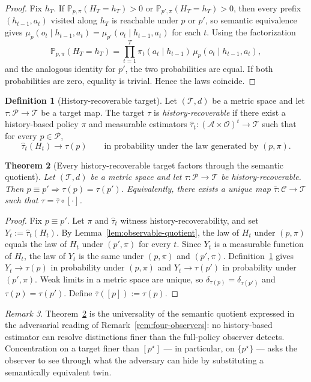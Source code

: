 \documentclass[11pt]{article}
\newtheorem{theorem}{Theorem}[section]
\theoremstyle{definition}
\newtheorem{definition}[theorem]{Definition}
\theoremstyle{remark}
\newtheorem{remark}[theorem]{Remark}
\newcommand{\Acal}{\mathcal{A}}
\newcommand{\Ccal}{\mathcal{C}}
\newcommand{\Ocal}{\mathcal{O}}
\newcommand{\Pcal}{\mathcal{P}}
\newcommand{\Prob}{\mathbb{P}}
\begin{document}
\begin{proof}
Fix $h_T$. If $\Prob_{p,\pi}(H_T=h_T)>0$ or $\Prob_{p',\pi}(H_T=h_T)>0$, then every prefix $(h_{t-1},a_t)$ visited along $h_T$ is reachable under $p$ or $p'$, so semantic equivalence gives $\mu_p(o_t\mid h_{t-1},a_t)=\mu_{p'}(o_t\mid h_{t-1},a_t)$ for each $t$. Using the factorization
\[
\Prob_{p,\pi}(H_T=h_T)
=
\prod_{t=1}^{T}\pi_t(a_t\mid h_{t-1})\,\mu_p(o_t\mid h_{t-1},a_t),
\]
and the analogous identity for $p'$, the two probabilities are equal. If both probabilities are zero, equality is trivial. Hence the laws coincide.
\end{proof}

\begin{definition}[History-recoverable target]
\label{def:history-recoverable}
Let $(\mathcal{T},d)$ be a metric space and let $\tau:\Pcal\to\mathcal{T}$ be a target map. The target $\tau$ is \emph{history-recoverable} if there exist a history-based policy $\pi$ and measurable estimators $\hat\tau_t:(\Acal\times\Ocal)^t\to\mathcal{T}$ such that for every $p\in\Pcal$,
\[
\hat\tau_t(H_t)\longrightarrow \tau(p)
\qquad
\text{in probability under the law generated by } (p,\pi).
\]
\end{definition}

\begin{theorem}[Every history-recoverable target factors through the semantic quotient]
\label{thm:factor-through-quotient}
Let $(\mathcal{T},d)$ be a metric space and let $\tau:\Pcal\to\mathcal{T}$ be history-recoverable. Then $p\equiv p'\Rightarrow\tau(p)=\tau(p')$. Equivalently, there exists a unique map $\bar\tau:\Ccal\to\mathcal{T}$ such that $\tau=\bar\tau\circ[\cdot]$.
\end{theorem}

\begin{proof}
Fix $p\equiv p'$. Let $\pi$ and $\hat\tau_t$ witness history-recoverability, and set $Y_t:=\hat\tau_t(H_t)$. By Lemma~\ref{lem:observable-quotient}, the law of $H_t$ under $(p,\pi)$ equals the law of $H_t$ under $(p',\pi)$ for every $t$. Since $Y_t$ is a measurable function of $H_t$, the law of $Y_t$ is the same under $(p,\pi)$ and $(p',\pi)$. Definition~\ref{def:history-recoverable} gives $Y_t\to\tau(p)$ in probability under $(p,\pi)$ and $Y_t\to\tau(p')$ in probability under $(p',\pi)$. Weak limits in a metric space are unique, so $\delta_{\tau(p)}=\delta_{\tau(p')}$ and $\tau(p)=\tau(p')$. Define $\bar\tau([p]):=\tau(p)$.
\end{proof}

\begin{remark}
Theorem~\ref{thm:factor-through-quotient} is the universality of the semantic quotient expressed in the adversarial reading of Remark~\ref{rem:four-observers}: no history-based estimator can resolve distinctions finer than the full-policy observer detects. Concentration on a target finer than $[p^\star]$ --- in particular, on $\{p^\star\}$ --- asks the observer to see through what the adversary can hide by substituting a semantically equivalent twin.
\end{remark}
\end{document}
